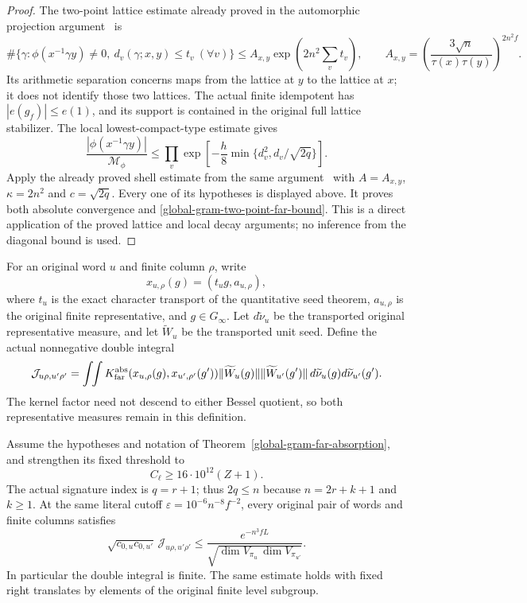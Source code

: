 \begin{proof}
The two-point lattice estimate already proved in
the automorphic projection argument~\cite{global-gram-two-point-inputs} is
\[
 \#\{\gamma:\phi(x^{-1}\gamma y)\ne0,
                   \ d_v(\gamma;x,y)\leq t_v\ (\forall v)\}
 \leq A_{x,y}\exp(2n^2\sum_vt_v),\qquad
 A_{x,y}=\left(\frac{3\sqrt n}{\tau(x)\tau(y)}\right)^{2n^2f}.
\]
Its arithmetic separation concerns maps from the lattice at $y$
to the lattice at $x$; it does not identify those two lattices.
The actual finite idempotent has $|e(g_f)|\leq e(1)$, and its
support is contained in the original full lattice stabilizer.
The local lowest-compact-type estimate gives
\[
 \frac{|\phi(x^{-1}\gamma y)|}{\mathcal M_\phi}
 \leq\prod_v\exp\left[-\frac h8
                \min\{d_v^2,d_v/\sqrt{2q}\}\right].
\]
Apply the already proved shell estimate
from the same argument~\cite{global-gram-two-point-inputs} with $A=A_{x,y}$, $\kappa=2n^2$ and
$c=\sqrt{2q}$.  Every one of its hypotheses is displayed above.
It proves both absolute convergence and
\eqref{global-gram-two-point-far-bound}.
This is a direct application of the proved lattice and local
decay arguments; no inference from the diagonal bound is used.
\end{proof}

For an original word $u$ and finite column $\rho$, write
\[
 x_{u,\rho}(g)=(t_ug,a_{u,\rho}),
\]
where $t_u$ is the exact character transport of the quantitative
seed theorem, $a_{u,\rho}$ is the original finite representative,
and $g\in G_\infty$.  Let $d\widetilde\nu_u$ be the transported
original representative measure, and let $\widetilde W_u$ be the
transported unit seed.  Define the actual nonnegative double integral
\[
 \mathcal J_{u\rho,u'\rho'}=
 \int\!\!\int
 K^{\rm abs}_{\rm far}(x_{u,\rho}(g),x_{u',\rho'}(g'))
 \|\widetilde W_u(g)\|\|\widetilde W_{u'}(g')\|
               \,d\widetilde\nu_u(g)d\widetilde\nu_{u'}(g').
\]
The kernel factor need not descend to either Bessel quotient, so
both representative measures remain in this definition.

\begin{theorem}
\label{global-gram-two-point-period-bound}
Assume the hypotheses and notation of
Theorem~\ref{global-gram-far-absorption}, and strengthen its fixed
threshold to
\[
 C_\ell\geq16\cdot10^{12}(Z+1).
\]
The actual signature index is $q=r+1$; thus $2q\leq n$
because $n=2r+k+1$ and $k\geq1$.
At the same literal cutoff $\varepsilon=10^{-6}n^{-8}f^{-2}$,
every original pair of words and finite columns satisfies
\begin{equation}\label{global-gram-two-point-period-estimate}
 \sqrt{c_{0,u}c_{0,u'}}\,\mathcal J_{u\rho,u'\rho'}
 \leq
 \frac{e^{-n^3fL}}{
          \sqrt{\dim V_{\pi_u}\,\dim V_{\pi_{u'}}}}.
\end{equation}
In particular the double integral is finite.  The same estimate
holds with fixed right translates by elements of the original
finite level subgroup.
\end{theorem}

